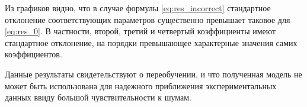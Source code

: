 \documentclass[12pt,a4paper]{article}
\begin{document}
Из графиков видно, что в случае формулы \eqref{eq:res_incorrect} стандартное
отклонение соответствующих параметров существенно превышает таковое для
\eqref{eq:res_0}. В частности, второй, третий и четвертый коэффициенты имеют
стандартное отклонение, на порядки превышающее характерные значения самих
коэффициентов.

Данные результаты свидетельствуют о переобучении, и что полученная модель не может быть
использована для надежного приближения экспериментальных данных ввиду большой чувствительности
к шумам.

\end{document}
